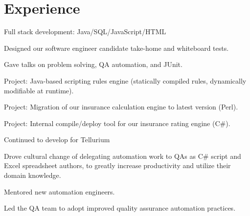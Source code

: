 \documentclass[letterpaper]{deedy-resume} %
\begin{document}
\begin{minipage}[t]{0.64\textwidth} %


\section{Experience}



\vspace{\topsep} %
Full stack development: Java/SQL/JavaScript/HTML
\vspace{\topsep} %
\begin{tightitemize}
\item Designed our software engineer candidate take-home and whiteboard tests.
\item Gave talks on problem solving, QA automation, and JUnit. 
\item Project:  Java-based scripting rules engine (statically compiled rules, dynamically modifiable at runtime).
\item Project:  Migration of our insurance calculation engine to latest version (Perl).
\item Project:  Internal compile/deploy tool for our insurance rating engine (C\#).
\end{tightitemize}
\sectionspace %



\vspace{\topsep} %
Continued to develop for Tellurium
\begin{tightitemize}
\item Drove cultural change of delegating automation work to QAs as C\# script and Excel spreadsheet authors, to greatly increase productivity and utilize their domain knowledge.
\item Mentored new automation engineers.
\item Led the QA team to adopt improved quality assurance automation practices.
\end{tightitemize}


\end{minipage}
\end{document}
